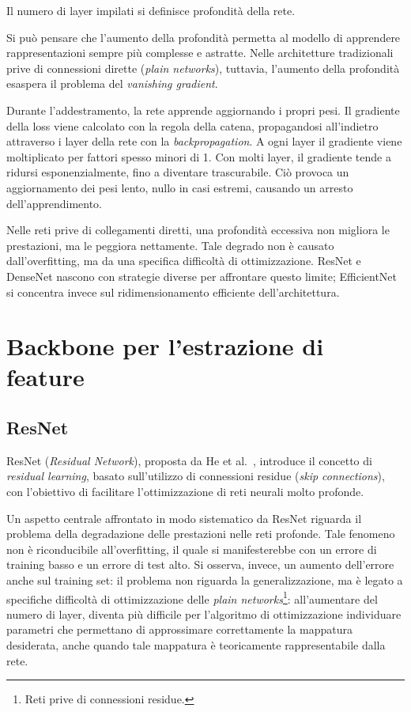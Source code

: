 Il numero di layer impilati si definisce profondità della rete.

Si può pensare che l’aumento della profondità permetta al modello di apprendere rappresentazioni sempre più complesse e astratte. Nelle architetture tradizionali prive di connessioni dirette (\textit{plain networks}), tuttavia, l’aumento della profondità esaspera il problema del \textit{vanishing gradient}.

Durante l’addestramento, la rete apprende aggiornando i propri pesi. Il gradiente della loss viene calcolato con la regola della catena, propagandosi all’indietro attraverso i layer della rete con la \textit{backpropagation}. A ogni layer il gradiente viene moltiplicato per fattori spesso minori di 1. Con molti layer, il gradiente tende a ridursi esponenzialmente, fino a diventare trascurabile. Ciò provoca un aggiornamento dei pesi lento, nullo in casi estremi, causando un arresto dell’apprendimento.

Nelle reti prive di collegamenti diretti, una profondità eccessiva non migliora le prestazioni, ma le peggiora nettamente. Tale degrado non è causato dall'overfitting, ma da una specifica difficoltà di ottimizzazione. ResNet e DenseNet nascono con strategie diverse per affrontare questo limite; EfficientNet si concentra invece sul ridimensionamento efficiente dell'architettura.

\section{Backbone per l'estrazione di feature}
\label{chapter:2.2}

\subsection{ResNet}

ResNet (\textit{Residual Network}), proposta da He et al.~\cite{He_2016_CVPR}, introduce il concetto di \textit{residual learning}, basato sull'utilizzo di connessioni residue (\textit{skip connections}), 
con l'obiettivo di facilitare l'ottimizzazione di reti neurali molto profonde.

Un aspetto centrale affrontato in modo sistematico da ResNet riguarda il problema della degradazione delle prestazioni nelle reti profonde. 
Tale fenomeno non è riconducibile all'overfitting, il quale si manifesterebbe con un errore di training basso e un errore di test alto. Si osserva, invece, un aumento dell'errore anche sul training set:
il problema non riguarda la generalizzazione, ma è legato a specifiche difficoltà di ottimizzazione delle \textit{plain networks}\footnote{Reti prive di connessioni residue.}: all'aumentare del numero di layer, 
diventa più difficile per l'algoritmo di ottimizzazione individuare parametri che permettano di approssimare correttamente la mappatura desiderata, 
anche quando tale mappatura è teoricamente rappresentabile dalla rete.

